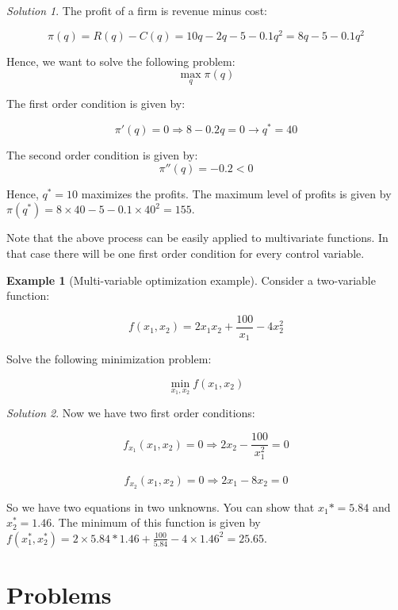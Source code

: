 \documentclass[
]{book}
\theoremstyle{definition}
\theoremstyle{definition}
\newtheorem{example}{Example}[chapter]
\theoremstyle{definition}
\theoremstyle{definition}
\theoremstyle{remark}
\newtheorem*{solution}{Solution}
\begin{document}
\begin{solution}
The profit of a firm is revenue minus cost:

\[\pi(q)= R(q) -C(q)= 10q-2q-5-0.1q^2=8q-5-0.1q^2\]

Hence, we want to solve the following problem:
\[\max_{q} \pi(q)\]

The first order condition is given by:

\[\pi'(q)=0 \Rightarrow 8-0.2q=0 \rightarrow q^*=40 \]

The second order condition is given by:
\[\pi''(q)=-0.2<0\]

Hence, \(q^*=10\) maximizes the profits. The maximum level of profits is given by \(\pi(q^*)=8\times 40-5-0.1\times 40^2=155\).
\end{solution}

Note that the above process can be easily applied to multivariate functions. In that case there will be one first order condition for every control variable.

\begin{example}[Multi-variable optimization example]
\protect\hypertarget{exm:unnamed-chunk-60}{}\label{exm:unnamed-chunk-60}Consider a two-variable function:

\[f(x_1,x_2)=2x_1x_2 + \frac{100}{x_1} - 4x_2^2\]

Solve the following minimization problem:

\[\min_{x_1,x_2} f(x_1,x_2)\]
\end{example}

\begin{solution}
Now we have two first order conditions:

\[f_{x_1}(x_1,x_2) = 0 \Rightarrow 2x_2 -\frac{100}{x_1^2}=0\]\\
\[f_{x_2}(x_1,x_2) = 0 \Rightarrow 2x_1 -8x_2=0\]

So we have two equations in two unknowns. You can show that \(x_1*=5.84\) and \(x_2^*=1.46\). The minimum of this function is given by \(f(x_1^*,x_2^*)=2\times 5.84*1.46+\frac{100}{5.84} - 4\times 1.46^2=25.65\).
\end{solution}

\hypertarget{problems-6}{%
\section*{Problems}\label{problems-6}}
\end{document}
